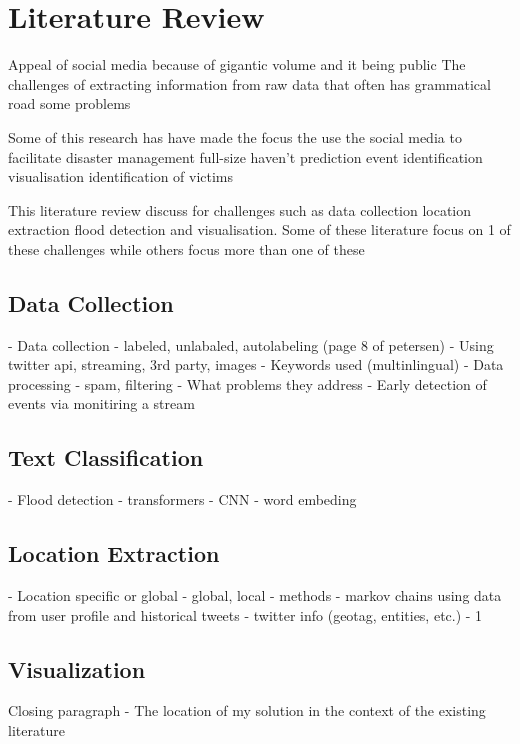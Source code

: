 \section{Literature Review}

Appeal of social media because of gigantic volume and it being public
The challenges of extracting information from raw data that often has grammatical road some problems

Some of this research has have made the focus the use the social media to facilitate disaster management full-size haven't prediction event identification visualisation identification of victims

This literature review discuss for challenges such as data collection location extraction flood detection and visualisation. Some of these literature focus on 1 of these challenges while others  focus more than one of these

\subsection{Data Collection}
- Data collection
  - labeled, unlabaled, autolabeling (page 8 of petersen)
  - Using twitter api, streaming, 3rd party, images
  - Keywords used (multinlingual)
  - Data processing
    - spam, filtering
- What problems they address
  - Early detection of events via monitiring a stream
\subsection{Text Classification}
- Flood detection
  - transformers
  - CNN
  - word embeding
\subsection{Location Extraction}
- Location specific or global
  - global, local
  - methods
    - markov chains using data from user profile and historical tweets
  - twitter info (geotag, entities, etc.)
  - 1%
\subsection{Visualization}

Closing paragraph
- The location of my solution in the context of the existing literature
